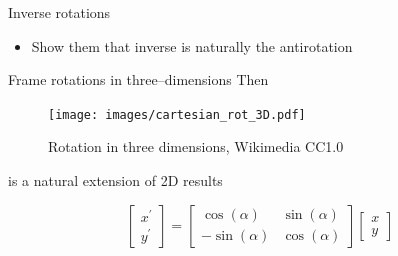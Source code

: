 \documentclass[presentation]{beamer}
\begin{document}
\begin{frame}[label={sec:org078ec28}]{Inverse rotations}
\begin{itemize}
\item Show them that inverse is naturally the antirotation
\end{itemize}
\end{frame}
\begin{frame}[label={sec:org98e9438}]{Frame rotations in three--dimensions}
Then
\begin{figure}[htbp]
\centering
\texttt{[image: images/cartesian\_rot\_3D.pdf]}
\caption{Rotation in three dimensions, Wikimedia CC1.0}
\end{figure}
is a natural extension of 2D results

\[ \begin{bmatrix} x^\prime \\ y^\prime \end{bmatrix}
   = \begin{bmatrix}\cos(\alpha )&\sin(\alpha )\\ -\sin(\alpha
   )&\cos(\alpha )\end{bmatrix} \begin{bmatrix} x\\ y\end{bmatrix}\]
\end{frame}
\end{document}

